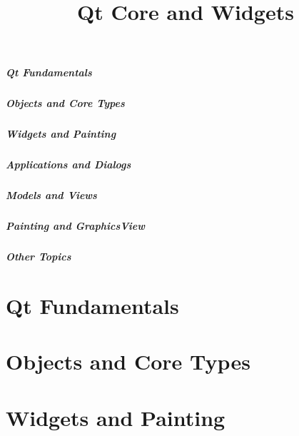 \documentclass[t]{beamer}
\title{Qt Core and Widgets}
\begin{document}


\setcounter{tocdepth}{2} %
\begin{frame}
  \frametitle{Qt Fundamentals}
  \tableofcontents[part=1]
  \vspace{108pt}
\end{frame}

\begin{frame}
  \frametitle{Objects and Core Types}
  \tableofcontents[part=2]
\end{frame}

\begin{frame}
  \frametitle{Widgets and Painting}
  \tableofcontents[part=3]
\end{frame}

\begin{frame}
  \frametitle{Applications and Dialogs}
  \tableofcontents[part=4]
\end{frame}

\begin{frame}
  \frametitle{Models and Views}
  \tableofcontents[part=5]
\end{frame}

\begin{frame}
  \frametitle{Painting and GraphicsView}
  \tableofcontents[part=6]
\end{frame}

\begin{frame}
  \frametitle{Other Topics}
  \tableofcontents[part=7]
\end{frame}


\setcounter{tocdepth}{3} %

\part{Qt Fundamentals}


\part{Objects and Core Types}




\part{Widgets and Painting}


\end{document}
